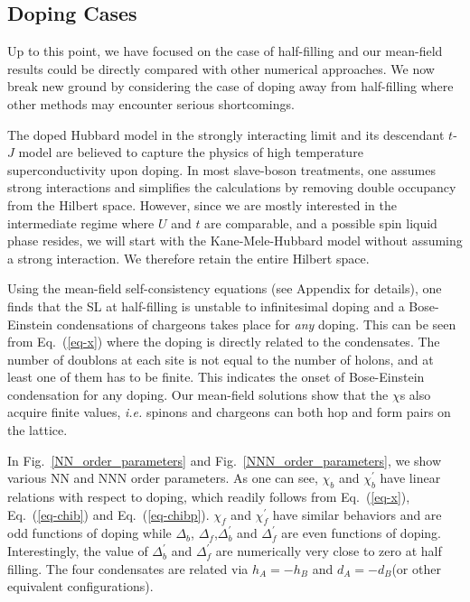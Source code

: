 \documentclass[aps,prb,twocolumn,superscriptaddress,showpacs]{revtex4-1}
\begin{document}
\subsection{Doping Cases}
Up to this point, we have focused on the case of half-filling and our mean-field results could be directly compared with other numerical approaches.\cite{Meng:nat10,Assaad:prl11,Wu:10,Imada:prb11,Hur:11,Rachel:prb10}  We now break new ground by considering the case of doping away from half-filling where other methods may encounter serious shortcomings.

The doped Hubbard model in the strongly interacting limit and its descendant $t$-$J$ model are believed to capture the physics of high temperature superconductivity upon doping.\cite{Wen:rmp06,Senthil:prb05} In most slave-boson treatments, one assumes strong interactions and simplifies the calculations by removing double occupancy from the Hilbert space. However, since we are mostly interested in the intermediate regime where $U$ and $t$ are comparable, and a possible spin liquid phase resides, we will start with the Kane-Mele-Hubbard model without assuming a strong interaction. We therefore retain the entire Hilbert space.

Using the mean-field self-consistency equations (see Appendix for details), one finds that the SL at half-filling is unstable to infinitesimal doping and a Bose-Einstein condensations of chargeons takes place for {\em any} doping. This can be seen from Eq.~(\ref{eq-x}) where the doping is directly related to the condensates. The number of doublons at each site is not equal to the number of holons, and at least one of them has to be finite. This indicates the onset of Bose-Einstein condensation for any doping. Our mean-field solutions show that the $\chi$s also acquire finite values, \emph{i.e.} spinons and chargeons can both hop and form pairs on the lattice.

In Fig.~\ref{NN_order_parameters} and Fig.~\ref{NNN_order_parameters}, we show various NN and NNN order parameters. As one can see, $\chi_b$ and $\chi_b^{\prime}$ have linear relations with respect to doping, which readily follows from Eq.~(\ref{eq-x}), Eq.~(\ref{eq-chib}) and Eq.~(\ref{eq-chibp}). $\chi_f$ and $\chi_f^{\prime}$ have similar behaviors and are odd functions of doping while $\Delta_b$, $\Delta_f$,$\Delta_b^{\prime}$ and $\Delta_f^{\prime}$ are even functions of doping. Interestingly, the value of $\Delta_b^{\prime}$ and $\Delta_f^{\prime}$ are numerically very close to zero at half filling. The four condensates are related via $h_A=-h_B$ and $d_A=-d_B$(or other equivalent configurations).
\end{document}
